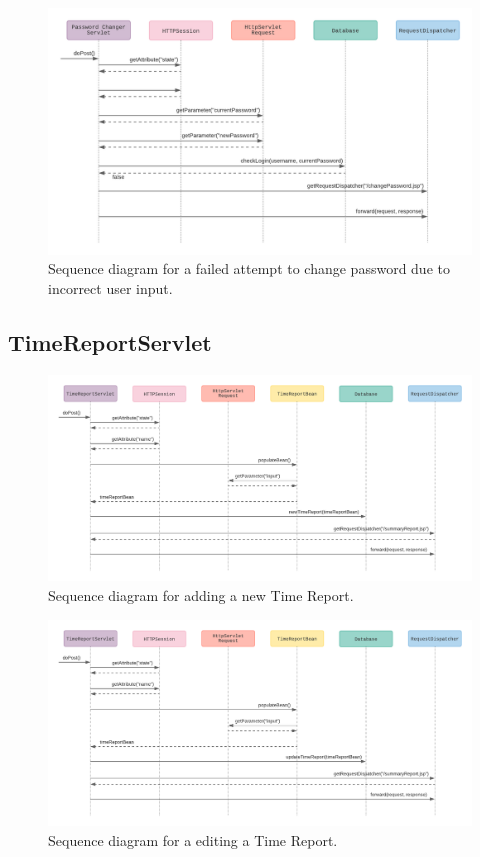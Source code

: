 \documentclass{article}
\begin{document}
\begin{figure}[H]
    \centering
    \includegraphics[scale=0.6]{images/changePasswordFalseInput.png}
    \caption{Sequence diagram for a failed attempt to change password due to incorrect user input.}
    \label{fig:failedPasswordChangeIncorrectInput}
\end{figure}

\pagebreak

\subsection{TimeReportServlet}

\begin{figure}[H]
    \centering
    \includegraphics[scale=0.6]{images/newTimeReport.png}
    \caption{Sequence diagram for adding a new Time Report.}
    \label{fig:newTimeReport}
\end{figure}

\begin{figure}[H]
    \centering
    \includegraphics[scale=0.6]{images/editTimeReport.png}
    \caption{Sequence diagram for a editing a Time Report.}
    \label{fig:editTimeReport}
\end{figure}
\end{document}
